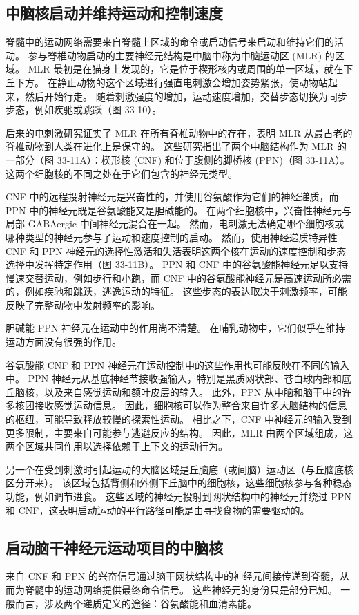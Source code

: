 \subsection{中脑核启动并维持运动和控制速度}
脊髓中的运动网络需要来自脊髓上区域的命令或启动信号来启动和维持它们的活动。 参与脊椎动物启动的主要神经元结构是中脑中称为中脑运动区 (MLR) 的区域。 MLR 最初是在猫身上发现的，它是位于楔形核内或周围的单一区域，就在下丘下方。 在静止动物的这个区域进行强直电刺激会增加姿势紧张，使动物站起来，然后开始行走。 随着刺激强度的增加，运动速度增加，交替步态切换为同步步态，例如疾驰或跳跃（图 33-10）。

后来的电刺激研究证实了 MLR 在所有脊椎动物中的存在，表明 MLR 从最古老的脊椎动物到人类在进化上是保守的。 这些研究指出了两个中脑结构作为 MLR 的一部分（图 33-11A）：楔形核 (CNF) 和位于腹侧的脚桥核 (PPN)（图 33-11A）。 这两个细胞核的不同之处在于它们包含的神经元类型。

CNF 中的远程投射神经元是兴奋性的，并使用谷氨酸作为它们的神经递质，而 PPN 中的神经元既是谷氨酸能又是胆碱能的。 在两个细胞核中，兴奋性神经元与局部 GABAergic 中间神经元混合在一起。 然而，电刺激无法确定哪个细胞核或哪种类型的神经元参与了运动和速度控制的启动。 然而，使用神经递质特异性 CNF 和 PPN 神经元的选择性激活和失活表明这两个核在运动的速度控制和步态选择中发挥特定作用（图 33-11B）。 PPN 和 CNF 中的谷氨酸能神经元足以支持慢速交替运动，例如步行和小跑，而 CNF 中的谷氨酸能神经元是高速运动所必需的，例如疾驰和跳跃，逃逸运动的特征。 这些步态的表达取决于刺激频率，可能反映了完整动物中发射频率的影响。

胆碱能 PPN 神经元在运动中的作用尚不清楚。 在哺乳动物中，它们似乎在维持运动方面没有很强的作用。

谷氨酸能 CNF 和 PPN 神经元在运动控制中的这些作用也可能反映在不同的输入中。 PPN 神经元从基底神经节接收强输入，特别是黑质网状部、苍白球内部和底丘脑核，以及来自感觉运动和额叶皮层的输入。 此外，PPN 从中脑和脑干中的许多核团接收感觉运动信息。 因此，细胞核可以作为整合来自许多大脑结构的信息的枢纽，可能导致释放较慢的探索性运动。 相比之下，CNF 中神经元的输入受到更多限制，主要来自可能参与逃避反应的结构。 因此，MLR 由两个区域组成，这两个区域共同作用以选择依赖于上下文的运动行为。

另一个在受到刺激时引起运动的大脑区域是丘脑底（或间脑）运动区（与丘脑底核区分开来）。 该区域包括背侧和外侧下丘脑中的细胞核，这些细胞核参与各种稳态功能，例如调节进食。 这些区域的神经元投射到网状结构中的神经元并绕过 PPN 和 CNF，这表明启动运动的平行路径可能是由寻找食物的需要驱动的。

\subsection{启动脑干神经元运动项目的中脑核}
来自 CNF 和 PPN 的兴奋信号通过脑干网状结构中的神经元间接传递到脊髓，从而为脊髓中的运动网络提供最终命令信号。 这些神经元的身份只是部分已知。 一般而言，涉及两个递质定义的途径：谷氨酸能和血清素能。

